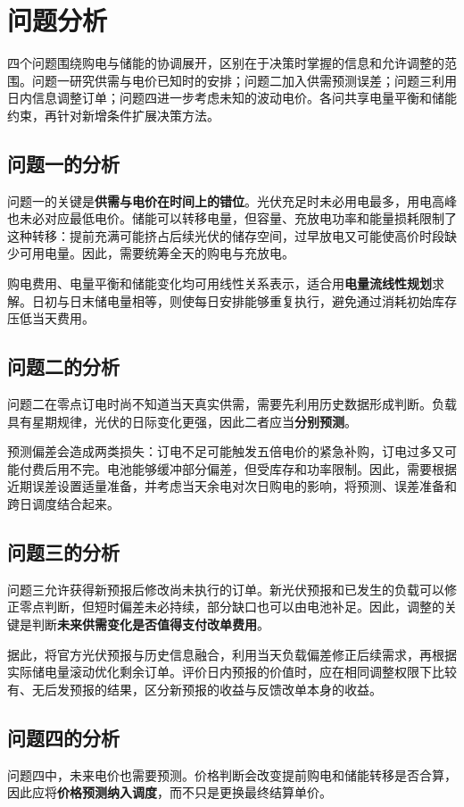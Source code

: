 \section{问题分析}

四个问题围绕购电与储能的协调展开，区别在于决策时掌握的信息和允许调整的范围。问题一研究供需与电价已知时的安排；问题二加入供需预测误差；问题三利用日内信息调整订单；问题四进一步考虑未知的波动电价。各问共享电量平衡和储能约束，再针对新增条件扩展决策方法。

\subsection{问题一的分析}
问题一的关键是\textbf{供需与电价在时间上的错位}。光伏充足时未必用电最多，用电高峰也未必对应最低电价。储能可以转移电量，但容量、充放电功率和能量损耗限制了这种转移：提前充满可能挤占后续光伏的储存空间，过早放电又可能使高价时段缺少可用电量。因此，需要统筹全天的购电与充放电。

购电费用、电量平衡和储能变化均可用线性关系表示，适合用\textbf{电量流线性规划}求解。日初与日末储电量相等，则使每日安排能够重复执行，避免通过消耗初始库存压低当天费用。

\subsection{问题二的分析}
问题二在零点订电时尚不知道当天真实供需，需要先利用历史数据形成判断。负载具有星期规律，光伏的日际变化更强，因此二者应当\textbf{分别预测}。

预测偏差会造成两类损失：订电不足可能触发五倍电价的紧急补购，订电过多又可能付费后用不完。电池能够缓冲部分偏差，但受库存和功率限制。因此，需要根据近期误差设置适量准备，并考虑当天余电对次日购电的影响，将预测、误差准备和跨日调度结合起来。

\subsection{问题三的分析}
问题三允许获得新预报后修改尚未执行的订单。新光伏预报和已发生的负载可以修正零点判断，但短时偏差未必持续，部分缺口也可以由电池补足。因此，调整的关键是判断\textbf{未来供需变化是否值得支付改单费用}。

据此，将官方光伏预报与历史信息融合，利用当天负载偏差修正后续需求，再根据实际储电量滚动优化剩余订单。评价日内预报的价值时，应在相同调整权限下比较有、无后发预报的结果，区分新预报的收益与反馈改单本身的收益。

\subsection{问题四的分析}
问题四中，未来电价也需要预测。价格判断会改变提前购电和储能转移是否合算，因此应将\textbf{价格预测纳入调度}，而不只是更换最终结算单价。

